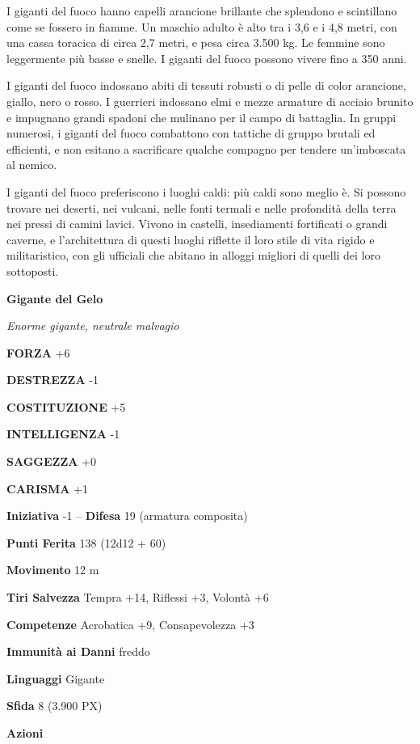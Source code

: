 \begin{multicols}{2}
	I giganti del fuoco hanno capelli arancione brillante che splendono e scintillano come se fossero in fiamme. Un maschio adulto è alto tra i 3,6 e i 4,8 metri, con una cassa toracica di circa 2,7 metri, e pesa circa 3.500 kg. Le femmine sono leggermente più basse e snelle. I giganti del fuoco possono vivere fino a 350 anni.

	I giganti del fuoco indossano abiti di tessuti robusti o di pelle di color arancione, giallo, nero o rosso. I guerrieri indossano elmi e mezze armature di acciaio brunito e impugnano grandi spadoni che mulinano per il campo di battaglia. In gruppi numerosi, i giganti del fuoco combattono con tattiche di gruppo brutali ed efficienti, e non esitano a sacrificare qualche compagno per tendere un'imboscata al nemico.

	I giganti del fuoco preferiscono i luoghi caldi: più caldi sono meglio è. Si possono trovare nei deserti, nei vulcani, nelle fonti termali e nelle profondità della terra nei pressi di camini lavici. Vivono in castelli, insediamenti fortificati o grandi caverne, e l'architettura di questi luoghi riflette il loro stile di vita rigido e militaristico, con gli ufficiali che abitano in alloggi migliori di quelli dei loro sottoposti.



	\medskip{}\textbf{Gigante del Gelo}

	\textit{Enorme gigante, neutrale malvagio}

	\textbf{FORZA} +6

	\textbf{DESTREZZA} -1

	\textbf{COSTITUZIONE} +5

	\textbf{INTELLIGENZA} -1

	\textbf{SAGGEZZA} +0

	\textbf{CARISMA} +1

	\textbf{Iniziativa} -1 -- \textbf{Difesa} 19 (armatura composita)

	\textbf{Punti Ferita} 138 (12d12 + 60)

	\textbf{Movimento} 12 m

	\textbf{Tiri Salvezza} Tempra +14, Riflessi +3, Volontà +6

	\textbf{Competenze} Acrobatica +9, Consapevolezza +3

	\textbf{Immunità ai Danni} freddo

	\textbf{Linguaggi} Gigante

	\textbf{Sfida} 8 (3.900 PX)

	\textbf{Azioni}


\end{multicols}
